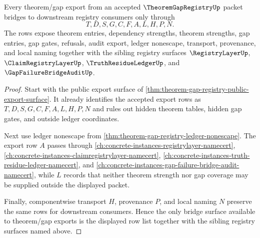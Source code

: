 \begin{theorem}
\label{thm:theorem-gap-registry-bridge-surface}
Every theorem/gap export from an accepted $\TheoremGapRegistryUp$ packet bridges to downstream registry consumers only through
$$
T,D,S,G,C,F,A,L,H,P,N.
$$
The rows expose theorem entries, dependency strengths, theorem strengths, gap entries, gap gates, refusals, audit export, ledger nonescape, transport, provenance, and local naming together with the sibling registry surfaces $\RegistryLayerUp$, $\ClaimRegistryLayerUp$, $\TruthResidueLedgerUp$, and $\GapFailureBridgeAuditUp$.
\end{theorem}
\begin{proof}
Start with the public export surface of \autoref{thm:theorem-gap-registry-public-export-surface}. It already identifies the accepted export rows as $T,D,S,G,C,F,A,L,H,P,N$ and rules out hidden theorem tables, hidden gap gates, and outside ledger coordinates.

Next use ledger nonescape from \autoref{thm:theorem-gap-registry-ledger-nonescape}. The export row $A$ passes through \autoref{ch:concrete-instances-registrylayer-namecert}, \autoref{ch:concrete-instances-claimregistrylayer-namecert}, \autoref{ch:concrete-instances-truth-residue-ledger-namecert}, and \autoref{ch:concrete-instances-gap-failure-bridge-audit-namecert}, while $L$ records that neither theorem strength nor gap coverage may be supplied outside the displayed packet.

Finally, componentwise transport $H$, provenance $P$, and local naming $N$ preserve the same rows for downstream consumers. Hence the only bridge surface available to theorem/gap exports is the displayed row list together with the sibling registry surfaces named above.
\end{proof}


\begin{closurestatus}{\TheoremGapRegistryUp}
  \theoryclosure{\matureClosure}
  \formalstatus{\unformalizedV}
\end{closurestatus}
